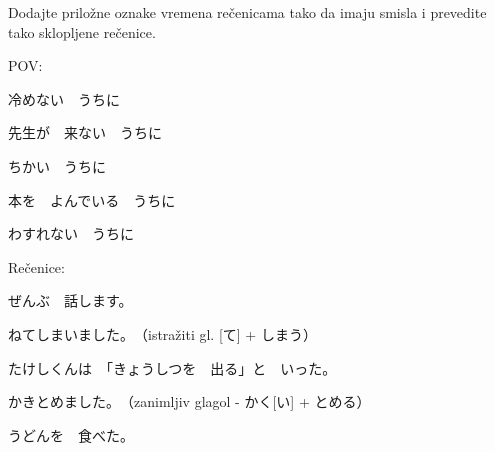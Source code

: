 
\author{Tomislav Mamić}

	
	Dodajte priložne oznake vremena rečenicama tako da imaju smisla i prevedite tako sklopljene rečenice.
	
	\begin{mondai}{POV:}
		\item 冷めない　うちに
		\item 先生が　来ない　うちに
		\item ちかい　うちに
		\item 本を　よんでいる　うちに
		\item わすれない　うちに
	\end{mondai}

	\begin{mondai}{Rečenice:}
		\item ぜんぶ　話します。
		\item ねてしまいました。　（istražiti gl. [て] + しまう）
		\item たけしくんは　「きょうしつを　出る」と　いった。
		\item かきとめました。　（zanimljiv glagol - かく[い] + とめる）
		\item うどんを　食べた。
	\end{mondai}
